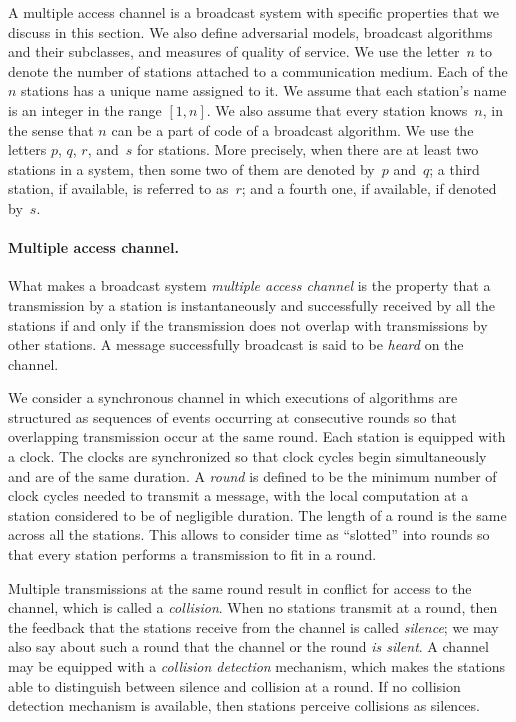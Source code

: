 \documentclass[11pt]{article}
\newcommand{\BBB}{\vspace*{-\bigskipamount}}
\newcommand{\Paragraph}[1]{\BBB\paragraph{#1}}
\begin{document}
A multiple access channel is a broadcast system with specific properties that we discuss in this section.
We also define adversarial models, broadcast algorithms and their subclasses, and measures of quality of service.
We use the letter~$n$ to denote the number of stations attached to a communication medium.
Each of the $n$ stations has a unique name assigned to it.
We assume that each station's name is an integer in the range $[1,n]$.
We also assume that every station knows~$n$, in the sense that $n$ can be a part of code of  a broadcast algorithm.
We use the letters $p$, $q$, $r$, and~$s$ for stations.
More precisely, when there are at least two stations in a system, then some two of them are denoted by~$p$ and~$q$; a third station, if available, is referred to as~$r$; and a fourth one, if available, if denoted by~$s$.



\Paragraph{Multiple access channel.}



What makes a broadcast system \emph{multiple access channel} is the property that a transmission by a station is instantaneously and successfully received by all the stations if and only if the transmission does not overlap with transmissions by other stations.
A message successfully broadcast is said to be \emph{heard} on the channel.

We consider a synchronous channel in which executions of algorithms are structured as sequences of events occurring at consecutive rounds so that overlapping transmission occur at the same round.
Each station is equipped with a clock.
The clocks are synchronized so that clock cycles begin simultaneously and are of the same duration.
A \emph{round} is defined to be the minimum number of clock cycles needed to transmit a message, with the local computation at a station considered to be of negligible duration.
The length of a round is the same across all the stations.
This allows to consider time as ``slotted'' into rounds so that every station  performs a transmission to fit in a round.

Multiple transmissions at the same round result in conflict for access to the channel, which is called a \emph{collision}.
When no stations transmit at a round, then the feedback that the stations receive from the channel is called \emph{silence}; we may also say about such a round that the channel or the round \emph{is silent}.
A channel may be equipped with a \emph{collision detection} mechanism, which makes the stations able to distinguish between silence and collision at a round.
If no collision detection mechanism is available, then stations perceive collisions as silences.
\end{document}
